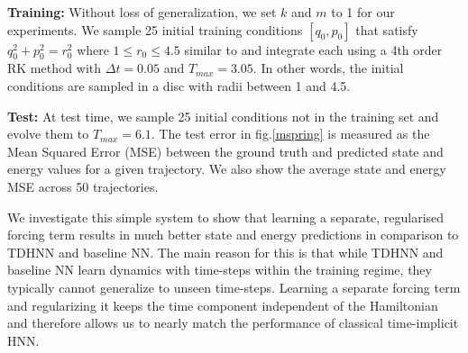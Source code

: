 \documentclass[twoside]{article}
\begin{document}
\textbf{Training:} Without loss of generalization, we set $k$ and $m$ to 1 for our experiments. We sample 25 initial training conditions $[q_0,p_0]$ that satisfy $q_0^2+p_0^2 = r_0^2$ where $1 \leq r_0 \leq 4.5$ similar to \cite{greydanus_hamiltonian_2019} and integrate each using a 4th order RK method with $\Delta t =0.05$ and $T_{max} = 3.05$. In other words, the initial conditions are sampled in a disc with radii between 1 and 4.5.

\textbf{Test:} At test time, we sample 25 initial conditions not in the training set and evolve them to $T_{max}=6.1$. The test error in fig.\ref{mspring} is measured as the Mean Squared Error (MSE) between the ground truth and predicted state and energy values for a given trajectory. We also show the average state and energy MSE  across 50 trajectories. 

We investigate this simple system to show that learning a separate, regularised forcing term results in much better state and energy predictions in comparison to TDHNN and baseline NN. The main reason for this is that while TDHNN and baseline NN learn dynamics with time-steps within the training regime, they typically cannot generalize to unseen time-steps. Learning a separate forcing term and regularizing it keeps the time component independent of the Hamiltonian and therefore allows us to nearly match the performance of classical time-implicit HNN.
\end{document}
